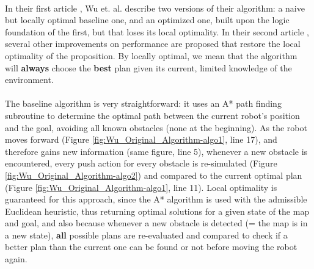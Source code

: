 \paragraph{} In their first article \parencite{wu_navigation_2010}, Wu et. al. describe two versions of their algorithm: a naive but locally optimal baseline one, and an optimized one, built upon the logic foundation of the first, but that loses its local optimality. In their second article \parencite{levihn_locally_2014}, several other improvements on performance are proposed that restore the local optimality of the proposition. By locally optimal, we mean that the algorithm will \textbf{always} choose the \textbf{best} plan given its current, limited knowledge of the environment.

\paragraph{} The baseline algorithm is very straightforward: it uses an A* path finding subroutine to determine the optimal path between the current robot's position and the goal, avoiding all known obstacles (none at the beginning). As the robot moves forward (Figure \ref{fig:Wu_Original_Algorithm-algo1}, line 17), and therefore gains new information (same figure, line 5), whenever a new obstacle is encountered, every push action for every obstacle is re-simulated (Figure \ref{fig:Wu_Original_Algorithm-algo2}) and compared to the current optimal plan (Figure \ref{fig:Wu_Original_Algorithm-algo1}, line 11). Local optimality is guaranteed for this approach, since the A* algorithm is used with the admissible Euclidean heuristic, thus returning optimal solutions for a given state of the map and goal, and also because whenever a new obstacle is detected (= the map is in a new state), \textbf{all} possible plans are re-evaluated and compared to check if a better plan than the current one can be found or not before moving the robot again.

